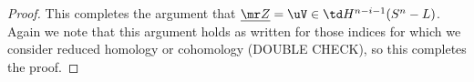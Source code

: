 \begin{example}
\begin{proof}
	This completes the argument that $\underline{\mr Z} = \uV \in \td H^{n-i-1}(S^n - L)$.
	Again we note that this argument holds as written for those indices for which we consider reduced homology or cohomology (DOUBLE CHECK), so this completes the proof.
\end{proof}


	\begin{comment}
    \begin{align*}
	\bd[ (-1)^i\mr T \sqcup - V^-]
	&=(-1)^i (\bd T)\hat{\vrule height1.3ex width0pt}\\
	& = (-1)^{i+1} [ (\bd (V_0) \times I) \sqcup (-1)^i\pi(V_0)\sqcup (-1)^{i+1} V_0]\hat{\vrule height1.3ex width0pt}
	\end{align*}
	Restricting to $S^n-L$ and simplifying, we get
	$$\bd \mr T = (-1)^{i+1} [ (\bd (V_0) \times I)]\hat{\vrule height1.3ex width0pt} \sqcup  (V_0)\hat{\vrule height1.3ex width0pt}.$$
	We note $$\bd V_0 = \bd (V \times_{S^n - L} S_x) = (-1)^{i+1} (\bd V) \times_{S^n-L} S_x$$ is in $Q_*(S^n - L)$, as $V$ represents a cocycle.
	On the other hand, by \cref{L: W0 cochain}, we have $\bd(V^-) = -V^0 \sqcup (\bd V)^-$, and similarly  $(\bd V)^- \in Q_*(S^n-L)$, as $V$ represents a cocycle.
	Finally we consider the pieces of $\bd[ (-1)^i\mr T \sqcup - V^-]$ that involve $V^0$.
	These are $(-1)^i(V_0)\hat{\vrule height1.3ex width0pt} \sqcup - V^0$.

 	NOWHERE




	By \cref{L: W0 cochain}, we have $\bd(V^-) = -V^0 \sqcup (\bd V)^-$.
	Since $V$ represents a cocycle, $\bd V \in Q^*(S^n-L)$, and hence so is $(\bd V)^-$ by \cref{L: pullback with Q}.
	For $\mr T$, we recall that $T = V_0 \times I$ as a space and that only $T \times 1$ maps to $L$.
	So $\mr T$ is $V_0 \times [0,1)$ with the induced co-orientation.
	We also have, adapting the computation above, that
	$$\bd T = [\bd (V_0) \times [0,1)] \sqcup (-1)^i V_0.$$
	As $\bd V_0$ is in $Q_*(S^n-L)$ (CHECK THIS IS SOMEWHERE), it follow (SAY MORE?) that the piece of $\bd \mr T$ coming from $\bd (V_0) \times [0,1)$ is in $Q^*(S^n-L)$.
	It remains to consider the components of $\bd[ (-1)^i\mr T \sqcup - V^-]$ involving $V^0$.
	Finally, we saw above that the components of $\bd Z = \bd \check V^+ \sqcup \bd (-1)^i T$ involving $V_0$ form a trivial pair.
	As $\mr T$ is co-oriented by the induced co-orientation from the orientation of $T$, equivalently $T$ is oriented by induced orientation from the co-orientation of $\mr T$; and similarly for $\check V^+$ and $V^+$.
	So, converting orientations to co-orientations, it must be that the components of $\bd V^+ \sqcup \bd (-1)^i \mr T$ involving $V^0$ (as a space) form a trivial pair (even though the co-orientation of $V^0$ is no necessarily the co-orientation induced from the orientation of $V_0$).
	But $\bd V^+ = - \bd V^-$, so the components of $-\bd V^- \sqcup \bd (-1)^i \mr T$ are a trivial precochain.
	It follows now that all of $-\bd V^- \sqcup \bd (-1)^i \mr T$ is in $Q^*(S^n-L)$, and hence so is the homotopy $\mc H$.
	\end{comment}
	\begin{comment}


\end{comment}
\end{example}
